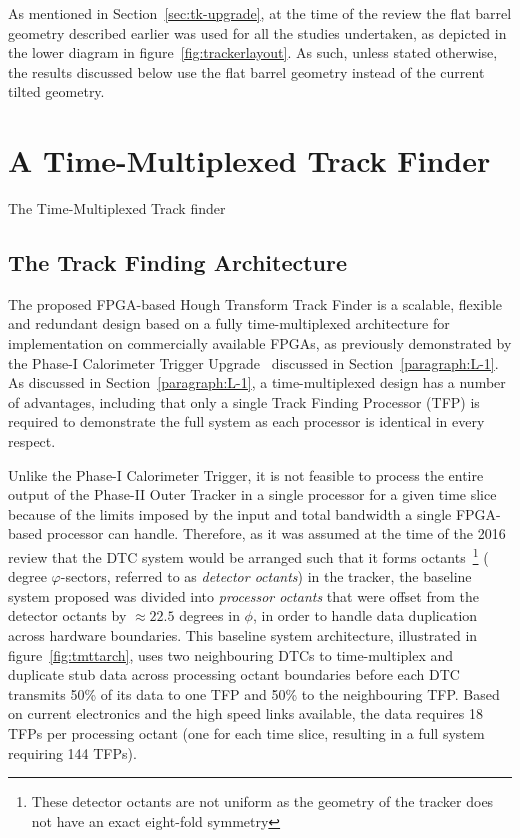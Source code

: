 As mentioned in Section~\ref{sec:tk-upgrade}, at the time of the review the flat barrel geometry described earlier was used for all the studies undertaken, as depicted in the lower diagram in figure~\ref{fig:trackerlayout}.
As such, unless stated otherwise, the results discussed below use the flat barrel geometry instead of the current tilted geometry.

\section{A Time-Multiplexed Track Finder }\label{sec:TMTT}
The Time-Multiplexed Track finder 

\subsection{The Track Finding Architecture}\label{subsec:TFA}
The proposed FPGA-based Hough Transform Track Finder is a scalable, flexible and redundant design based on a fully time-multiplexed architecture for implementation on commercially available FPGAs, as previously demonstrated by the Phase-I Calorimeter Trigger Upgrade~\cite{Tapper:2013yva} discussed in Section~\ref{paragraph:L-1}.
As discussed in Section~\ref{paragraph:L-1}, a time-multiplexed design has a number of advantages, including that only a single Track Finding Processor (TFP) is required to demonstrate the full system as each processor is identical in every respect.

Unlike the Phase-I Calorimeter Trigger, it is not feasible to process the entire output of the Phase-II Outer Tracker in a single processor for a given time slice because of the limits imposed by the input and total bandwidth a single FPGA-based processor can handle.
Therefore, as it was assumed at the time of the 2016 review that the DTC system would be arranged such that it forms octants~\footnote{These detector octants are not uniform as the geometry of the tracker does not have an exact eight-fold symmetry} ( degree $\varphi$-sectors, referred to as \emph {detector octants}) in the tracker, the baseline system proposed was divided into \emph{processor octants} that were offset from the detector octants by $\approx 22.5$ degrees in $\phi$, in order to handle data duplication across hardware boundaries.
This baseline system architecture, illustrated in figure~\ref{fig:tmttarch}, uses two neighbouring DTCs to time-multiplex and duplicate stub data across processing octant boundaries before each DTC transmits 50\% of its data to one TFP and 50\% to the neighbouring TFP.
Based on current electronics and the high speed links available, the data requires 18 TFPs per processing octant (one for each time slice, resulting in a full system requiring 144 TFPs).

